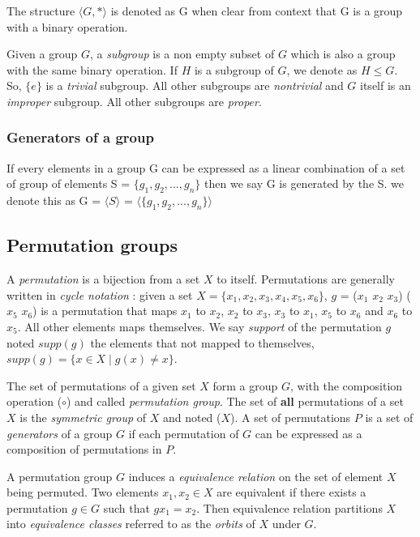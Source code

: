 The structure $\langle G, * \rangle$ is denoted as G when clear from context that G is a group
with a binary operation.

Given a group $G$, a \emph{subgroup} is a non empty subset of $G$ which is also a group with 
the same binary operation. If $H$ is a subgroup of $G$, we denote as $H \leq G$.
So, $\{e\}$ is a \emph{trivial} subgroup. All other subgroups are \emph{nontrivial} and
$G$ itself is an \emph{improper} subgroup. All other subgroups are \emph{proper}.




\subsubsection{Generators of a group}

If every elements in a group G can be expressed as a linear combination
of a set of group of elements S = $\{g_1, g_2, ..., g_n \}$ then we say G is 
generated by the S. we denote this as G = $\langle S \rangle$ =
$\langle \{g_1, g_2, ..., g_n \} \rangle$ 


\subsection{Permutation groups}


A \emph{permutation} is a bijection from a set $X$ to itself. Permutations are generally written in 
\emph{cycle notation} : given a set $X = \{x_1, x_2, x_3, x_4, x_5, x_6\}$, $g$ = ($x_1$ $x_2$ $x_3$) ($x_5$ $x_6$) 
is a permutation that maps $x_1$ to $x_2$, $x_2$ to $x_3$, $x_3$ to $x_1$,  $x_5$ to $x_6$ and $x_6$ to $x_5$.
All other elements maps themselves.
We say \emph{support} of the permutation $g$ noted $supp(g)$ the elements that not mapped to themselves,
$supp(g) = \{ x \in X \mid g(x) \neq x\}$.


 The set of permutations of a given set $X$ form a group $G$,
with the composition operation ($\circ$) and called \emph{permutation group}.
The set of \textbf{all} permutations of a set $X$ is the \emph{symmetric group} of $X$ and noted \Group($X$).
A set of permutations $P$ is a set of \emph{generators} of a group $G$ if each permutation of $G$
can be expressed as a composition of permutations in $P$. 


A permutation group $G$ induces a \emph{equivalence relation} on the set of element $X$ being
permuted. Two elements $x_1, x_2 \in X$ are equivalent if there exists a permutation $g \in G$ such that
$g x_1 = x_2$. Then equivalence relation partitions $X$ into \emph{equivalence classes} referred to
as the \emph{orbits} of $X$ under $G$. 

